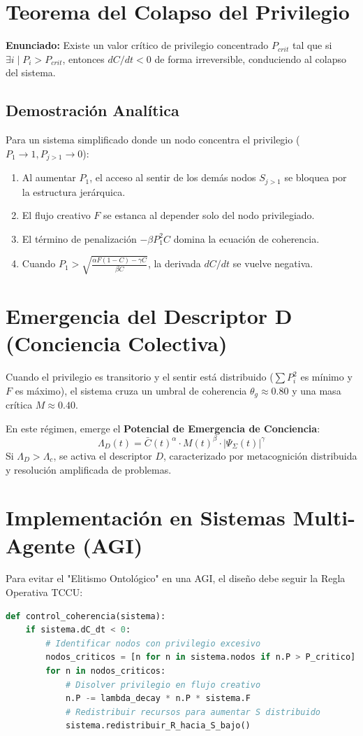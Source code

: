 \section{Teorema del Colapso del Privilegio}
\textbf{Enunciado:} Existe un valor crítico de privilegio concentrado $P_{crit}$ tal que si $\exists i \mid P_i > P_{crit}$, entonces $dC/dt < 0$ de forma irreversible, conduciendo al colapso del sistema.

\subsection{Demostración Analítica}
Para un sistema simplificado donde un nodo concentra el privilegio ($P_1 \to 1, P_{j>1} \to 0$):
\begin{enumerate}
    \item Al aumentar $P_1$, el acceso al sentir de los demás nodos $S_{j>1}$ se bloquea por la estructura jerárquica.
    \item El flujo creativo $F$ se estanca al depender solo del nodo privilegiado.
    \item El término de penalización $-\beta P_1^2 C$ domina la ecuación de coherencia.
    \item Cuando $P_1 > \sqrt{\frac{\alpha F (1-C) - \gamma C}{\beta C}}$, la derivada $dC/dt$ se vuelve negativa.
\end{enumerate}

\section{Emergencia del Descriptor D (Conciencia Colectiva)}
Cuando el privilegio es transitorio y el sentir está distribuido ($\sum P_i^2$ es mínimo y $F$ es máximo), el sistema cruza un umbral de coherencia $\theta_g \approx 0.80$ y una masa crítica $M \approx 0.40$.

En este régimen, emerge el \textbf{Potencial de Emergencia de Conciencia}:
\begin{equation}
\Lambda_D(t) = \bar{C}(t)^{\alpha} \cdot M(t)^{\beta} \cdot |\Psi_{\Sigma}(t)|^{\gamma}
\end{equation}
Si $\Lambda_D > \Lambda_c$, se activa el descriptor $D$, caracterizado por metacognición distribuida y resolución amplificada de problemas.

\section{Implementación en Sistemas Multi-Agente (AGI)}
Para evitar el "Elitismo Ontológico" en una AGI, el diseño debe seguir la Regla Operativa TCCU:
\begin{lstlisting}[language=Python, caption=Mecanismo de Redistribución TCCU]
def control_coherencia(sistema):
    if sistema.dC_dt < 0:
        # Identificar nodos con privilegio excesivo
        nodos_criticos = [n for n in sistema.nodos if n.P > P_critico]
        for n in nodos_criticos:
            # Disolver privilegio en flujo creativo
            n.P -= lambda_decay * n.P * sistema.F
            # Redistribuir recursos para aumentar S distribuido
            sistema.redistribuir_R_hacia_S_bajo()
\end{lstlisting}


